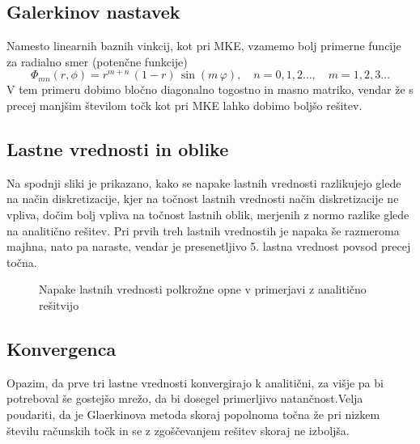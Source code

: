 \subsection{Galerkinov nastavek}

Namesto linearnih baznih vinkcij, kot pri MKE, vzamemo bolj primerne funcije za radialno smer (potenčne funkcije)
\begin{equation}
    \Phi_{m n}(r,\phi) = r^{m+n} \,(1-r)\,\sin(m\,\varphi), \quad n = 0,1,2\ldots,\quad m = 1,2,3\ldots
\end{equation}
V tem primeru dobimo bločno diagonalno togostno in masno matriko, vendar že s precej manjšim številom točk kot pri MKE lahko dobimo boljšo rešitev.

\subsection{Lastne vrednosti in oblike}

Na spodnji sliki je prikazano, kako se napake lastnih vrednosti razlikujejo glede na način diskretizacije, kjer na točnost lastnih vrednosti način diskretizacije ne vpliva, dočim bolj vpliva na točnost lastnih oblik, merjenih z normo razlike glede na analitično rešitev. Pri prvih treh lastnih vrednostih je napaka še razmeroma majhna, nato pa naraste, vendar je presenetljivo 5. lastna vrednost povsod precej točna.

\begin{figure}[H]
    \centering
    \caption{Napake lastnih vrednosti polkrožne opne v primerjavi z analitično rešitvijo}
\end{figure}

\subsection{Konvergenca}

Opazim, da prve tri lastne vrednosti konvergirajo k analitični, za višje pa bi potreboval še gostejšo mrežo, da bi dosegel primerljivo natančnost.Velja poudariti, da je Glaerkinova metoda skoraj popolnoma točna že pri nizkem številu računskih točk in se z zgoščevanjem rešitev skoraj ne izboljša.

